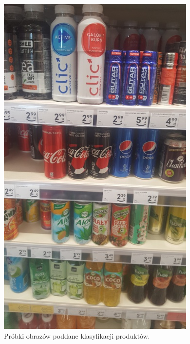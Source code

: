 {{\begin{figure}[htb]
	\caption{Próbki obrazów poddane klasyfikacji produktów.}
	\label{beforeClasification}
	\noindent\begin{minipage}
		{0.43\textwidth}\raggedleft		\includegraphics[width=\linewidth]{"images/detection_sample"}
	\end{minipage}
	\begin{minipage}{0.57\textwidth}

\end{minipage}
\end{figure}}}
